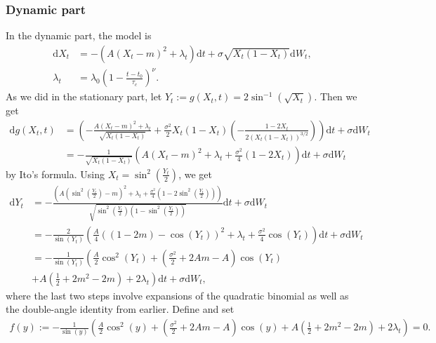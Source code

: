 \subsubsection{Dynamic part}
In the dynamic part, the model is
\begin{align}
    \mathrm{d}X_t &= -\left(A(X_t - m)^2 + \lambda_t\right)\mathrm{d}t + \sigma \sqrt{X_t\left(1 - X_t\right)}\mathrm{d}W_t,\\
    \lambda_t &= \lambda_0 \left(1 - \frac{t - t_0}{\tau_c}\right)^\nu.
\end{align}
As we did in the stationary part, let $Y_t := g(X_t, t) = 2 \sin^{-1}\left(\sqrt{X_t}\right)$. Then we get 
\begin{align}
    \mathrm{d}g(X_t, t) &= \left(-\frac{A(X_t - m)^2 + \lambda_t}{\sqrt{X_t\left(1 - X_t\right)}} + \frac{\sigma^2}{2}X_t\left(1 - X_t\right)\left(-\frac{1 - 2X_t}{2\left(X_t\left(1 - X_t\right)\right)^{3/2}}\right)\right)\mathrm{d}t + \sigma\mathrm{d}W_t \nonumber\\
    &= -\frac{1}{\sqrt{X_t\left(1 - X_t\right)}}\left(A\left(X_t - m\right)^2 + \lambda_t + \frac{\sigma^2}{4}\left(1 - 2X_t\right)\right)\mathrm{d}t + \sigma\mathrm{d}W_t
\end{align}
by Ito's formula. Using $X_t = \sin^2\left(\frac{Y_t}{2}\right)$, we get
\begin{align}
    \mathrm{d}Y_t &= -\frac{\left(A\left(\sin^2\left(\frac{Y_t}{2}\right) - m\right)^2 + \lambda_t + \frac{\sigma^2}{4}\left(1 - 2\sin^2\left(\frac{Y_t}{2}\right)\right)\right)}{\sqrt{\sin^2\left(\frac{Y_t}{2}\right)\left(1 - \sin^2\left(\frac{Y_t}{2}\right)\right)}}\mathrm{d}t + \sigma\mathrm{d}W_t \nonumber \\
    &= -\frac{2}{\sin(Y_t)}\left(\frac{A}{4}\left(\left(1 - 2m\right) - \cos(Y_t)\right)^2 + \lambda_t + \frac{\sigma^2}{4}\cos(Y_t)\right)\mathrm{d}t + \sigma\mathrm{d}W_t\nonumber \\
    &= - \frac{1}{\sin(Y_t)}\left(\frac{A}{2}\cos^2(Y_t) + \left(\frac{\sigma^2}{2} + 2 Am - A\right)\cos(Y_t) \right. \nonumber \\
    &+ \left. A \left(\frac{1}{2} + 2m^2 - 2m\right) + 2\lambda_t\right)\mathrm{d}t + \sigma \mathrm{d}W_t, \label{eq:JacobiLampertiDynamicSDE}
\end{align}
where the last two steps involve expansions of the quadratic binomial as well as the double-angle identity from earlier. Define and set
\begin{align*}
    f(y):= -\frac{1}{\sin(y)}\left(\frac{A}{2}\cos^2(y) + \left(\frac{\sigma^2}{2} + 2 Am - A\right)\cos(y)
    + A \left(\frac{1}{2} + 2m^2 - 2m\right) + 2\lambda_t\right) = 0.
\end{align*}
